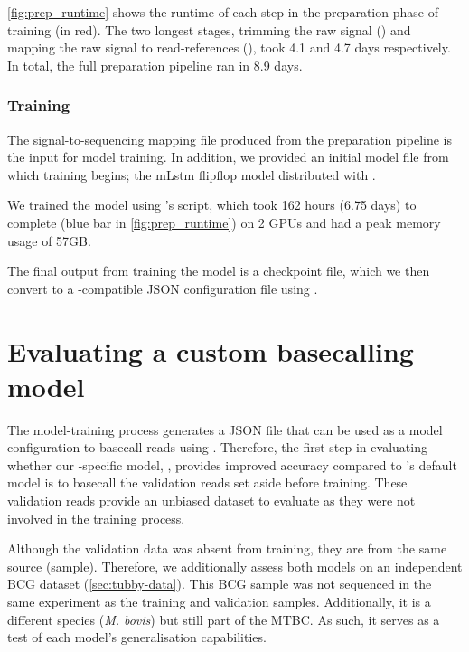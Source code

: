 \autoref{fig:prep_runtime} shows the runtime of each step in the preparation phase of training (in red). The two longest stages, trimming the raw signal () and mapping the raw signal to read-references (), took 4.1 and 4.7 days respectively. In total, the full preparation pipeline ran in 8.9 days. 

\subsubsection{Training}

The signal-to-sequencing mapping file produced from the preparation pipeline is the input for model training. In addition, we provided an initial model file from which training begins; the mLstm flipflop model distributed with \taiyaki{}.

We trained the model using \taiyaki{}'s  script, which took 162 hours (6.75 days) to complete (blue bar in \autoref{fig:prep_runtime}) on 2 GPUs and had a peak memory usage of 57GB. 

The final output from training the model is a checkpoint file, which we then convert to a \guppy{}-compatible JSON configuration file using \taiyaki{}.

\section{Evaluating a custom \ont{} basecalling model}

The model-training process generates a JSON file that can be used as a model configuration to basecall \ont{} reads using \guppy{}. Therefore, the first step in evaluating whether our \mtb{}-specific model, \tubby{}, provides improved accuracy compared to \guppy{}'s default model is to basecall the validation reads set aside before training. These validation reads provide an unbiased dataset to evaluate as they were not involved in the training process. 

Although the validation data was absent from training, they are from the same source (sample). Therefore, we additionally assess both models on an independent BCG dataset (\autoref{sec:tubby-data}). This BCG sample was not sequenced in the same experiment as the training and validation samples. Additionally, it is a different species (\textit{M. bovis}) but still part of the MTBC. As such, it serves as a test of each model's generalisation capabilities. 

